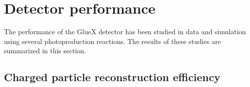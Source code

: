 
\section[Detector performance (Sean)]{Detector performance \label{sec:performance}}

The performance of the GlueX detector has been studied in data and simulation using several photoproduction reactions.  The results of these studies are summarized in this section.




\subsection{Charged particle reconstruction efficiency  \label{sec:trackeff}}

